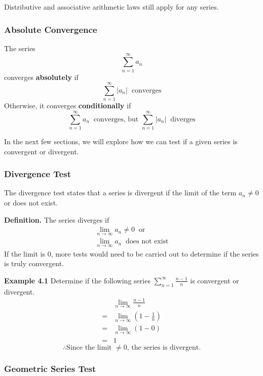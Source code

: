 \documentclass[12pt]{article}
\begin{document}
Distributive and associative arithmetic laws still apply for any series.

\subsubsection{Absolute Convergence}

The series
\[
	\displaystyle\sum_{n=1}^{\infty}a_n
\]
converges \textbf{absolutely} if
\[
	\displaystyle\sum_{n=1}^{\infty}|a_n| \;\; \text{converges}
\]
Otherwise, it converges \textbf{conditionally} if
\[
	\displaystyle\sum_{n=1}^{\infty}a_n \;\; \text{converges, but } \displaystyle\sum_{n=1}^{\infty}|a_n| \;\; \text{diverges}
\]

In the next few sections, we will explore how we can test if a given series is convergent or divergent.

\subsubsection{Divergence Test}

The divergence test states that a series is divergent if the limit of the term $a_n \neq 0$ or does not exist.

\textbf{Definition.} The series diverges if
\begin{gather*}
	\displaystyle\lim_{n\rightarrow\infty}a_n \neq 0  \;\;  \text{or}  \\
	\displaystyle\lim_{n\rightarrow\infty}a_n \;\; \text{does not exist}
\end{gather*}
If the limit is $0$, more tests would need to be carried out to determine if the series is truly convergent.

\textbf{Example 4.1} Determine if the following series $\displaystyle\sum_{n=1}^{\infty}\frac{n - 1}{n}$ is convergent or divergent.
\begin{align*}
	  & \displaystyle\lim_{n\rightarrow\infty}\frac{n - 1}{n}   \\
	= & \displaystyle\lim_{n\rightarrow\infty}(1 - \frac{1}{n}) \\
	= & \displaystyle\lim_{n\rightarrow\infty}(1 - 0)           \\
	= & 1
\end{align*}
\[
	\therefore \text{Since the limit $\neq 0$, the series is divergent}.
\]

\subsubsection{Geometric Series Test}
\end{document}
